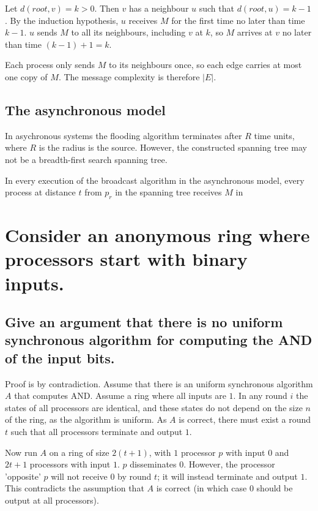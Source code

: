 \documentclass[11pt]{article} %
\begin{document}
Let $d(root, v) = k > 0$. Then $v$ has a neighbour $u$ such that $d(root, u) = k - 1$. By the induction hypothesis, $u$ receives $M$ for the first time no later than time $k - 1$. $u$ sends $M$ to all its neighbours, including $v$ at $k$, so $M$ arrives at $v$ no later than time $(k - 1) + 1 = k$.

Each process only sends $M$ to its neighbours once, so each edge carries at most one copy of $M$. The message complexity is therefore $|E|$.

\subsection{The asynchronous model}

In asychronous systems the flooding algorithm terminates after $R$ time units, where $R$ is the radius is the source. However, the constructed spanning tree may not be a breadth-first search spanning tree. 

In every execution of the broadcast algorithm in the asynchronous model, every process at distance $t$ from $p_r$ in the spanning tree receives $M$ in 

\section{Consider an anonymous ring where processors start with binary inputs.}

\subsection{Give an argument that there is no uniform synchronous algorithm for computing the AND of the input bits.}

Proof is by contradiction. Assume that there is an uniform synchronous algorithm $A$ that computes AND. Assume a ring where all inputs are $1$. In any round $i$ the states of all processors are identical, and these states do not depend on the size $n$ of the ring, as the algorithm is uniform. As $A$ is correct, there must exist a round $t$ such that all processors terminate and output $1$.

Now run $A$ on a ring of size $2(t + 1)$, with $1$ processor $p$ with input $0$ and $2t + 1$ processors with input $1$. $p$ disseminates $0$. However, the processor 'opposite' $p$ will not receive $0$ by round $t$; it will instead terminate and output $1$. This contradicts the assumption that $A$ is correct (in which case $0$ should be output at all processors).  
\end{document}

